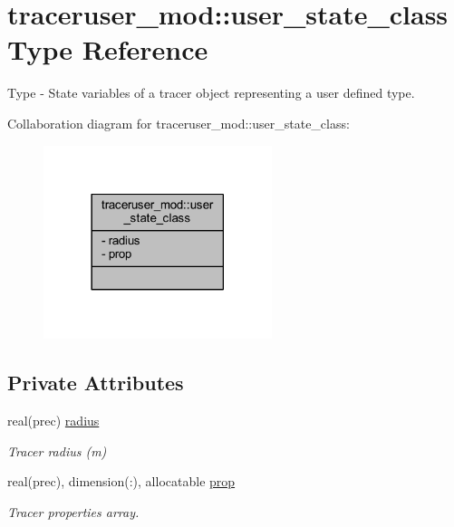 \hypertarget{structtraceruser__mod_1_1user__state__class}{}\section{traceruser\+\_\+mod\+:\+:user\+\_\+state\+\_\+class Type Reference}
\label{structtraceruser__mod_1_1user__state__class}


Type -\/ State variables of a tracer object representing a user defined type.  




Collaboration diagram for traceruser\+\_\+mod\+:\+:user\+\_\+state\+\_\+class\+:\nopagebreak
\begin{figure}[H]
\begin{center}
\leavevmode
\includegraphics[width=189pt]{structtraceruser__mod_1_1user__state__class__coll__graph}
\end{center}
\end{figure}
\subsection*{Private Attributes}
\begin{DoxyCompactItemize}
\item 
real(prec) \mbox{\hyperlink{structtraceruser__mod_1_1user__state__class_a3d7a35c3da2c73261d03de9bb9914c07}{radius}}
\begin{DoxyCompactList}\small\item\em Tracer radius (m) \end{DoxyCompactList}\item 
real(prec), dimension(\+:), allocatable \mbox{\hyperlink{structtraceruser__mod_1_1user__state__class_a803743e4e70a29b15fd27b20b017f402}{prop}}
\begin{DoxyCompactList}\small\item\em Tracer properties array. \end{DoxyCompactList}\end{DoxyCompactItemize}


